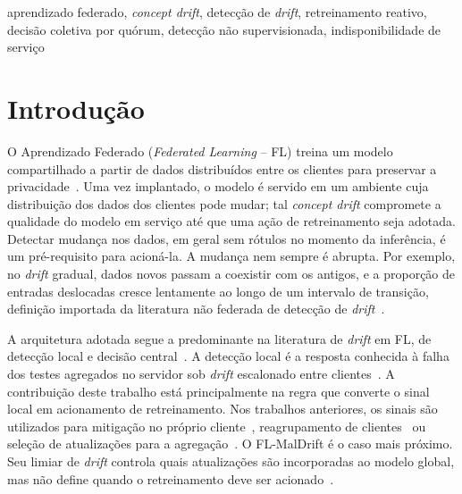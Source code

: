 \documentclass[conference]{IEEEtran}
\begin{document}
\begin{IEEEkeywords}
aprendizado federado, \textit{concept drift}, detecção de \textit{drift}, retreinamento reativo, decisão coletiva por quórum, detecção não supervisionada, indisponibilidade de serviço
\end{IEEEkeywords}

\section{Introdução}\label{sec:intro}
O Aprendizado Federado (\textit{Federated Learning} -- FL) treina um modelo compartilhado a partir de dados distribuídos entre os clientes para preservar a privacidade~\cite{mcmahan2017}. Uma vez implantado, o modelo é servido em um ambiente cuja distribuição dos dados dos clientes pode mudar; tal \textit{concept drift} compromete a qualidade do modelo em serviço até que uma ação de retreinamento seja adotada. Detectar mudança nos dados, em geral sem rótulos no momento da inferência, é um pré-requisito para acioná-la. A mudança nem sempre é abrupta. Por exemplo, no \textit{drift} gradual, dados novos passam a coexistir com os antigos, e a proporção de entradas deslocadas cresce lentamente ao longo de um intervalo de transição, definição importada da literatura não federada de detecção de \textit{drift}~\cite{poenaru2022,cerqueira2026}. 


A arquitetura adotada segue a predominante na literatura de \textit{drift} em FL, de detecção local e decisão central~\cite{jothimurugesan2023,chow2023,mavromatis2024,patel2026,han2026,fu2025,zhou2026,casado2022,chen2026}. A detecção local é a resposta conhecida à falha dos testes agregados no servidor sob \textit{drift} escalonado entre clientes~\cite{jothimurugesan2023}. A contribuição deste trabalho está principalmente na regra que converte o sinal local em acionamento de retreinamento. Nos trabalhos anteriores, os sinais são utilizados para mitigação no próprio cliente~\cite{chow2023,mavromatis2024}, reagrupamento de clientes~\cite{fu2025,zhou2026} ou seleção de atualizações para a agregação~\cite{patel2026}. O FL-MalDrift é o caso mais próximo. Seu limiar de \textit{drift} controla quais atualizações são incorporadas ao modelo global, mas não define quando o retreinamento deve ser acionado~\cite{patel2026}.
\end{document}

